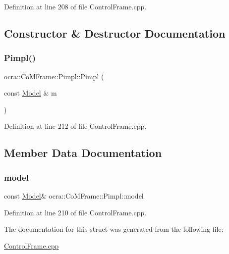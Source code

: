 Definition at line 208 of file Control\+Frame.\+cpp.



\subsection{Constructor \& Destructor Documentation}
\hypertarget{structocra_1_1CoMFrame_1_1Pimpl_a2b4badc79278777e9f5a570e7b583905}{}\label{structocra_1_1CoMFrame_1_1Pimpl_a2b4badc79278777e9f5a570e7b583905} 
\subsubsection{\texorpdfstring{Pimpl()}{Pimpl()}}
{\footnotesize\ttfamily ocra\+::\+Co\+M\+Frame\+::\+Pimpl\+::\+Pimpl (\begin{DoxyParamCaption}\item[{const \hyperlink{classocra_1_1Model}{Model} \&}]{m }\end{DoxyParamCaption})\hspace{0.3cm}{\ttfamily [inline]}}



Definition at line 212 of file Control\+Frame.\+cpp.



\subsection{Member Data Documentation}
\hypertarget{structocra_1_1CoMFrame_1_1Pimpl_aa6727f07a45efaed605571d416ff4727}{}\label{structocra_1_1CoMFrame_1_1Pimpl_aa6727f07a45efaed605571d416ff4727} 
\subsubsection{\texorpdfstring{model}{model}}
{\footnotesize\ttfamily const \hyperlink{classocra_1_1Model}{Model}\& ocra\+::\+Co\+M\+Frame\+::\+Pimpl\+::model}



Definition at line 210 of file Control\+Frame.\+cpp.



The documentation for this struct was generated from the following file\+:\begin{DoxyCompactItemize}
\item 
\hyperlink{ControlFrame_8cpp}{Control\+Frame.\+cpp}\end{DoxyCompactItemize}
